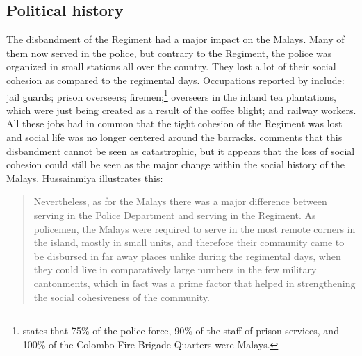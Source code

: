 




\subsection{Political history}\label{sec:slmbg:postreg:Political history}
The disbandment of the Regiment had a major impact on the Malays.
Many of them now served in the police, but contrary to the
Regiment, the police was organized in small stations all over the
country. They lost a lot of their social cohesion as compared to the
regimental days. Occupations reported by  \citet[10]{Saldin2003} include:
 jail guards; prison overseers;
  firemen;\footnote{\citet[432]{Hussein2007} states that 75\% of the police force, 90\% of the staff of prison services, and 100\% of the Colombo Fire Brigade Quarters were Malays.}
 overseers in the inland tea plantations, which were just being created as a result of
the coffee blight;
and railway workers.
All these jobs had in common that the tight cohesion of the Regiment
was lost and social life was no longer centered around the
barracks. \citet{SmithRH} comments that this disbandment cannot be seen as catastrophic, but it appears that the loss of social cohesion could still be seen as the major change within the social history of the Malays. Hussainmiya illustrates this:

\begin{quote}
    Nevertheless, as for the Malays there was a major difference between serving in the Police Department and serving in the Regiment. As policemen, the Malays were required to serve in the most remote corners in the island, mostly in small units, and therefore their community came to be disbursed in far away places unlike during the regimental days, when they could live in comparatively large numbers in the few military cantonments, which in fact was a prime factor that helped in strengthening the social cohesiveness of the community. \citep[194]{Hussainmiya1990}
\end{quote}


